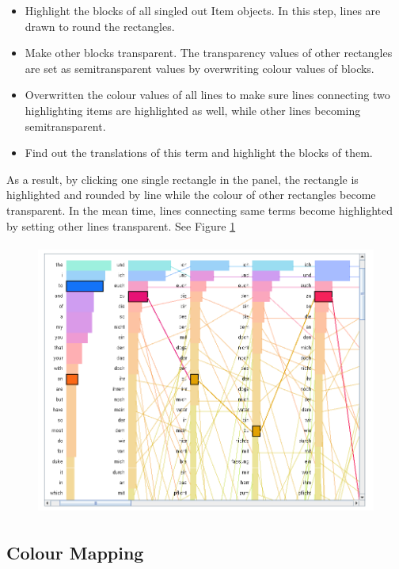 \begin{itemize}
	\item \textbf{} Highlight the blocks of all singled out Item objects. In this step, lines are drawn to round the rectangles. 
	\item \textbf{} Make other blocks transparent. The transparency values of other rectangles are set as  semitransparent values by overwriting colour values of blocks.
	\item \textbf{} Overwritten the colour values of all lines to make sure lines connecting two highlighting items are highlighted as well, while other lines becoming semitransparent.
	\item \textbf{} Find out the translations of this term and highlight the blocks of them.	
\end{itemize}

As a result, by clicking one single rectangle in the panel, the rectangle is highlighted and rounded by line while the colour of other rectangles become transparent. In the mean time, lines connecting same terms become highlighted by setting other lines transparent. See Figure \ref{fig:highlightView}

\begin{figure}[h]
	\centering	
	\includegraphics[width=16cm, height=9cm]{Figs/Highlight-Terms}\\[1ex]
	\caption{}
	\label{fig:highlightView}
\end{figure} 

\subsection{Colour Mapping}

